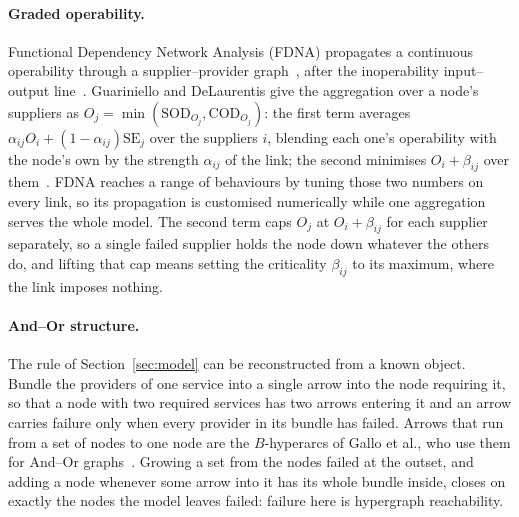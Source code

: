\documentclass{svproc}
\begin{document}
\paragraph{Graded operability.}
Functional Dependency Network Analysis (FDNA) propagates a continuous operability
through a supplier--provider graph~\cite{garvey_introduction_2010,garvey_modelling_2014},
after the inoperability input--output line~\cite{haimes_leontief-based_2001}.
Guariniello and DeLaurentis give the aggregation over a node's suppliers as
$O_j = \min(\mathrm{SOD}_{O_j}, \mathrm{COD}_{O_j})$: the first term averages
$\alpha_{ij}O_i + (1-\alpha_{ij})\mathrm{SE}_j$ over the suppliers $i$,
blending each one's operability with the node's own by the strength
$\alpha_{ij}$ of the link; the second minimises $O_i + \beta_{ij}$ over
them~\cite{guariniello_dependency_2013}. FDNA reaches a range of behaviours by
tuning those two numbers on every link, so its propagation is customised
numerically while one aggregation serves the whole model. The second term caps
$O_j$ at $O_i + \beta_{ij}$ for each supplier separately, so a single failed
supplier holds the node down whatever the others do, and lifting that cap means
setting the criticality $\beta_{ij}$ to its maximum, where the link imposes
nothing.

\paragraph{And--Or structure.}
The rule of Section~\ref{sec:model} can be reconstructed from a known object. Bundle the providers of
one service into a single arrow into the node requiring it, so that a node with
two required services has two arrows entering it and an arrow carries failure
only when every provider in its bundle has failed. Arrows that run from a set of
nodes to one node are the $B$-hyperarcs of Gallo et al., who use them for
And--Or graphs~\cite{gallo_directed_1993}. Growing a set from the nodes failed
at the outset, and adding a node whenever some arrow into it has its whole
bundle inside, closes on exactly the nodes the model leaves failed: failure here
is hypergraph reachability.
\end{document}
